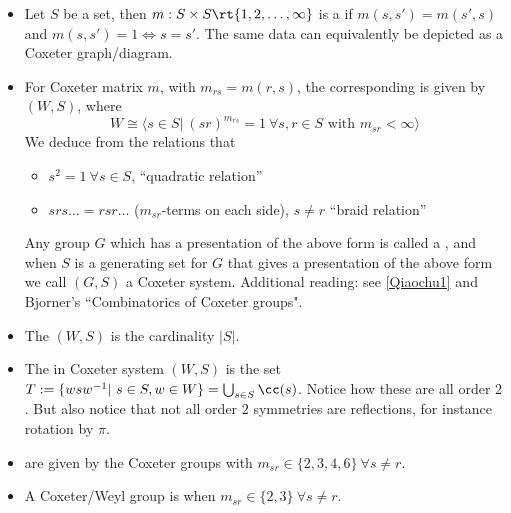\begin{definition}
\begin{itemize}
    \item Let $S$ be a set, then $m:S\times S\rt \{1,2,\dots,\infty\}$ is a  if $m(s,s')=m(s',s)$ and $m(s,s')=1\iff s=s'$. The same data can equivalently be depicted as a Coxeter graph/diagram.
    
    \item For Coxeter matrix $m$, with $m_{rs}=m(r,s)$, the corresponding  is given by $(W,S)$, where 
    $$W\cong \langle s\in S|\ (sr)^{m_{rs}}=1\ \forall s,r\in S \text{ with } m_{sr}<\infty\rangle$$
      We deduce from the relations that
    \begin{itemize}
      \item $s^2=1\ \forall s\in S$, ``quadratic relation''
    
      \item $srs\dots = rsr\dots$ ($m_{sr}$-terms on each side), $s\neq r$  ``braid relation''
  \end{itemize}
  Any group $G$ which has a presentation of the above form is called a , and when $S$ is a generating set for $G$ that gives a presentation of the above form we call $(G,S)$ a Coxeter system. Additional reading: see \hyperlink{https://qchu.wordpress.com/2010/06/26/coxeter-groups/}{[Qiaochu1]} and Bjorner's ``Combinatorics of Coxeter groups". 
  \item The  $(W,S)$ is the cardinality $|S|$.
  
  \item The  in Coxeter system $(W,S)$ is the set $T:=\{wsw^{-1}|\ s\in S,w\in W\}=\bigcup_{s\in S}\cc(s)$.\bb 
    Notice how these are all order $2$. But also notice that not all order $2$ symmetries are reflections, for instance rotation by $\pi$. 
  
  \item {} are given by the Coxeter groups with $m_{sr}\in \{2,3,4,6\}\ \forall s\neq r$.
  
  \item A Coxeter/Weyl group is  when $m_{sr}\in \{2,3\}\ \forall s\neq r$.
    

\end{itemize}
\end{definition}
